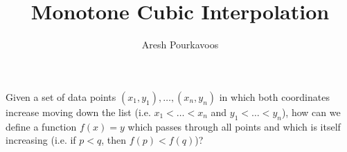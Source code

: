 \documentclass{article}
\begin{document}
\title{Monotone Cubic Interpolation}
\author{Aresh Pourkavoos}
\maketitle

Given a set of data points $(x_1, y_1), \ldots, (x_n, y_n)$
in which both coordinates increase moving down the list
(i.e. $x_1 < \ldots < x_n$ and $y_1 < \ldots < y_n$),
how can we define a function $f(x) = y$ which passes through all points
and which is itself increasing (i.e. if $p < q$, then $f(p) < f(q)$)?
\end{document}
